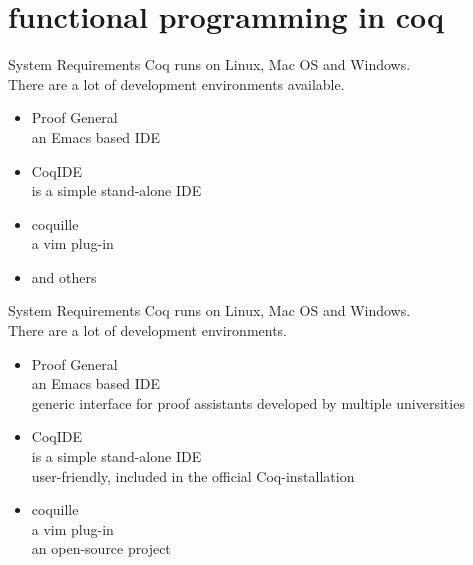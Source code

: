 \documentclass{beamer}
\begin{document}
%
%	


	\section{functional programming in coq}
	
	\begin{frame}[containsverbatim]{System Requirements}
		Coq runs on Linux, Mac OS and Windows.\\
		There are a lot of development environments available.
			\begin{itemize}
				\item \alert{Proof General}\\
						 an Emacs based IDE\\
				\item \alert{CoqIDE}\\ 
						is a simple stand-alone IDE
				\item \alert{coquille} \\
						a vim plug-in 
				\item and others
			\end{itemize}
	\end{frame}
	
	
	\begin{frame}[containsverbatim]{System Requirements}
		Coq runs on Linux, Mac OS and Windows.\\
		There are a lot of development environments.
			\begin{itemize}
				\item \alert{Proof General}\\
						 an Emacs based IDE\\
						 generic interface for proof assistants developed by multiple universities						 
				\item \alert{CoqIDE}\\ 
						is a simple stand-alone IDE\\
						user-friendly, included in the official Coq-installation
				\item \alert{coquille} \\
						a vim plug-in\\
						an open-source project
			\end{itemize}
	\end{frame}
	
\end{document}
